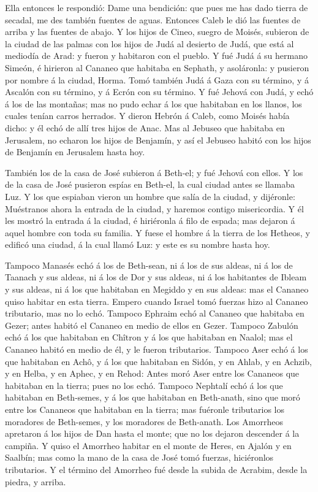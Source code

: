  Ella entonces le respondió: Dame una bendición: que pues
me has dado tierra de secadal, me des también fuentes de aguas. Entonces
Caleb le dió las fuentes de arriba y las fuentes de abajo. 
Y los hijos de Cineo, suegro de Moisés, subieron de la ciudad de las
palmas con los hijos de Judá al desierto de Judá, que está al mediodía
de Arad: y fueron y habitaron con el pueblo.  Y fué Judá á
su hermano Simeón, é hirieron al Cananeo que habitaba en Sephath, y
asoláronla: y pusieron por nombre á la ciudad, Horma.  Tomó
también Judá á Gaza con su término, y á Ascalón con su término, y á
Ecrón con su término.  Y fué Jehová con Judá, y echó á los
de las montañas; mas no pudo echar á los que habitaban en los llanos,
los cuales tenían carros herrados.  Y dieron Hebrón á
Caleb, como Moisés había dicho: y él echó de allí tres hijos de Anac.
 Mas al Jebuseo que habitaba en Jerusalem, no echaron los
hijos de Benjamín, y así el Jebuseo habitó con los hijos de Benjamín en
Jerusalem hasta hoy.

 También los de la casa de José subieron á Beth-el; y fué
Jehová con ellos.  Y los de la casa de José pusieron espías
en Beth-el, la cual ciudad antes se llamaba Luz.  Y los que
espiaban vieron un hombre que salía de la ciudad, y dijéronle:
Muéstranos ahora la entrada de la ciudad, y haremos contigo
misericordia.  Y él les mostró la entrada á la ciudad, é
hiriéronla á filo de espada; mas dejaron á aquel hombre con toda su
familia.  Y fuese el hombre á la tierra de los Hetheos, y
edificó una ciudad, á la cual llamó Luz: y este es su nombre hasta hoy.

 Tampoco Manasés echó á los de Beth-sean, ni á los de sus
aldeas, ni á los de Taanach y sus aldeas, ni á los de Dor y sus aldeas,
ni á los habitantes de Ibleam y sus aldeas, ni á los que habitaban en
Megiddo y en sus aldeas: mas el Cananeo quiso habitar en esta tierra.
 Empero cuando Israel tomó fuerzas hizo al Cananeo
tributario, mas no lo echó.  Tampoco Ephraim echó al
Cananeo que habitaba en Gezer; antes habitó el Cananeo en medio de ellos
en Gezer.  Tampoco Zabulón echó á los que habitaban en
Chîtron y á los que habitaban en Naalol; mas el Cananeo habitó en medio
de él, y le fueron tributarios.  Tampoco Aser echó á los
que habitaban en Achô, y á los que habitaban en Sidón, y en Ahlab, y en
Achzib, y en Helba, y en Aphec, y en Rehod:  Antes moró
Aser entre los Cananeos que habitaban en la tierra; pues no los echó.
 Tampoco Nephtalí echó á los que habitaban en Beth-semes, y
á los que habitaban en Beth-anath, sino que moró entre los Cananeos que
habitaban en la tierra; mas fuéronle tributarios los moradores de
Beth-semes, y los moradores de Beth-anath.  Los Amorrheos
apretaron á los hijos de Dan hasta el monte; que no los dejaron
descender á la campiña.  Y quiso el Amorrheo habitar en el
monte de Heres, en Ajalón y en Saalbín; mas como la mano de la casa de
José tomó fuerzas, hiciéronlos tributarios.  Y el término
del Amorrheo fué desde la subida de Acrabim, desde la piedra, y arriba.


